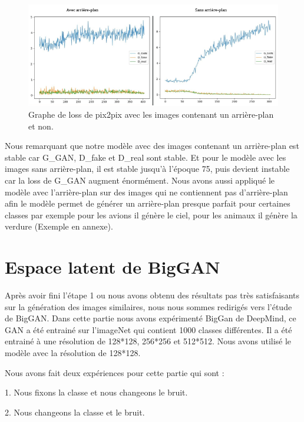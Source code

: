 \begin{figure}[H] 
	\centering 
	\includegraphics[width=1.0\textwidth]{./resources/img/im_pascal_loss.png} %
	\caption{Graphe de loss de pix2pix avec les images contenant un arrière-plan et non.} %
	\label{Fig4_2} %
\end{figure}

Nous remarquant que notre modèle avec des images contenant un arrière-plan est stable car G{\_}GAN, D{\_}fake et D{\_}real sont stable. Et pour le modèle avec les images sans arrière-plan, il est stable jusqu'à l'époque 75, puis devient instable car la loss de G{\_}GAN augment énormément.
Nous avons aussi appliqué le modèle avec l'arrière-plan sur des images qui ne contiennent pas d'arrière-plan afin le modèle permet de générer un arrière-plan presque parfait pour certaines classes par exemple pour les avions il génère le ciel, pour les animaux il génère la verdure (Exemple en annexe).


\section{Espace latent de BigGAN}

Après avoir fini l'étape 1 ou nous avons obtenu des résultats pas très satisfaisants sur la génération des images similaires, nous nous sommes redirigés vers l'étude de BigGAN.  Dans cette partie nous avons expérimenté BigGan de DeepMind, ce GAN a été entrainé sur l'imageNet qui contient 1000 classes différentes. Il a été entrainé à une résolution de 128*128, 256*256 et 512*512. Nous avons utilisé le modèle avec la résolution de 128*128.

Nous avons fait deux expériences pour cette partie qui sont :

1.	Nous fixons la classe et nous changeons le bruit.

2.	Nous changeons la classe et le bruit.


